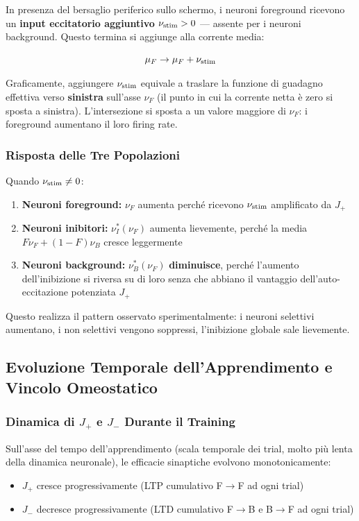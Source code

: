 In presenza del bersaglio periferico sullo schermo, i neuroni foreground ricevono un \textbf{input eccitatorio aggiuntivo} $\nu_{\rm stim} > 0$ — assente per i neuroni background. Questo termina si aggiunge alla corrente media:

\begin{equation}
\mu_F \to \mu_F + \nu_{\rm stim}
\end{equation}

Graficamente, aggiungere $\nu_{\rm stim}$ equivale a traslare la funzione di guadagno effettiva verso \textbf{sinistra} sull'asse $\nu_F$ (il punto in cui la corrente netta è zero si sposta a sinistra). L'intersezione si sposta a un valore maggiore di $\nu_F$: i foreground aumentano il loro firing rate.

\subsubsection{Risposta delle Tre Popolazioni}

Quando $\nu_{\rm stim} \neq 0$:

\begin{enumerate}
    \item \textbf{Neuroni foreground:} $\nu_F$ aumenta perché ricevono $\nu_{\rm stim}$ amplificato da $J_+$
    \item \textbf{Neuroni inibitori:} $\nu_I^*(\nu_F)$ aumenta lievemente, perché la media $F\nu_F + (1-F)\nu_B$ cresce leggermente
    \item \textbf{Neuroni background:} $\nu_B^*(\nu_F)$ \textbf{diminuisce}, perché l'aumento dell'inibizione si riversa su di loro senza che abbiano il vantaggio dell'auto-eccitazione potenziata $J_+$
\end{enumerate}

Questo realizza il pattern osservato sperimentalmente: i neuroni selettivi aumentano, i non selettivi vengono soppressi, l'inibizione globale sale lievemente.

\subsection{Evoluzione Temporale dell'Apprendimento e Vincolo Omeostatico}

\subsubsection{Dinamica di $J_+$ e $J_-$ Durante il Training}

Sull'asse del tempo dell'apprendimento (scala temporale dei trial, molto più lenta della dinamica neuronale), le efficacie sinaptiche evolvono monotonicamente:
\begin{itemize}
    \item $J_+$ cresce progressivamente (LTP cumulativo F$\rightarrow$F ad ogni trial)
    \item $J_-$ decresce progressivamente (LTD cumulativo F$\rightarrow$B e B$\rightarrow$F ad ogni trial)
\end{itemize}

